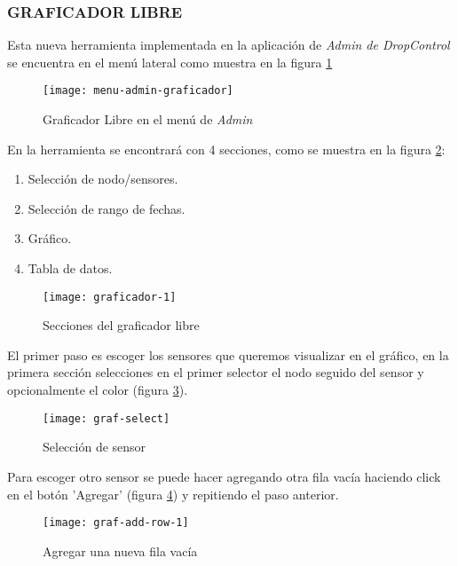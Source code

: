 \subsubsection{GRAFICADOR LIBRE}


Esta nueva herramienta implementada en la aplicación de \textit{Admin de DropControl} se encuentra en el menú lateral como muestra en la figura \ref{fig:menu-admin-graf}

\begin{figure}[H]
	\centering
	\texttt{[image: menu-admin-graficador]}
	\caption{\label{fig:menu-admin-graf} Graficador Libre en el menú de \textit{Admin}}
\end{figure}

En la herramienta se encontrará con 4 secciones, como se muestra en la figura \ref{fig:graf1}:
\begin{enumerate}
    \item Selección de nodo/sensores.
    \item Selección de rango de fechas.
    \item Gráfico.
    \item Tabla de datos.
\end{enumerate}

\begin{figure}[H]
	\centering
	\texttt{[image: graficador-1]}
	\caption{\label{fig:graf1} Secciones del graficador libre}
\end{figure}

El primer paso es escoger los sensores que queremos visualizar en el gráfico, en la primera sección selecciones en el primer selector el nodo seguido del sensor y opcionalmente el color (figura \ref{fig:grafselect}).

\begin{figure}[H]
	\centering
	\texttt{[image: graf-select]}
	\caption{\label{fig:grafselect} Selección de sensor}
\end{figure}

Para escoger otro sensor se puede hacer agregando otra fila vacía haciendo click en el botón 'Agregar' (figura \ref{fig:graf-add-row-1}) y repitiendo el paso anterior.

\begin{figure}[H]
	\centering
	\texttt{[image: graf-add-row-1]}
	\caption{\label{fig:graf-add-row-1} Agregar una nueva fila vacía}
\end{figure}

